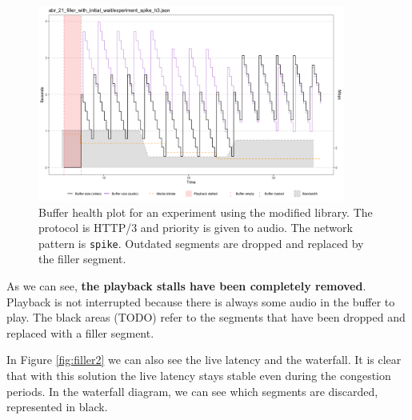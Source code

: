 \begin{figure}[h]
    \centering
    \includegraphics[width=0.9\textwidth]{res/impr_hls_filler.png}
    \caption{Buffer health plot for an experiment using the modified \hlsjs{} library. The protocol is HTTP/3 and priority is given to audio. The network pattern is \texttt{spike}. Outdated segments are dropped and replaced by the filler segment.}
    \label{fig:filler1}
\end{figure}

As we can see, \textbf{the playback stalls have been completely removed}. Playback is not interrupted because there is always some audio in the buffer to play. The black areas (TODO) refer to the segments that have been dropped and replaced with a filler segment.

In Figure \ref{fig:filler2} we can also see the live latency and the waterfall. It is clear that with this solution the live latency stays stable even during the congestion periods. In the waterfall diagram, we can see which segments are discarded, represented in black.

